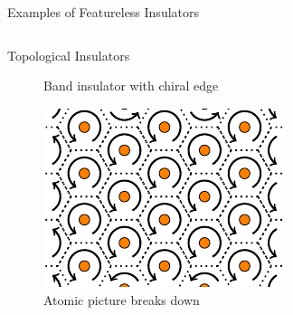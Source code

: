 \begin{frame}{Examples of Featureless Insulators}
\begin{columns}[T]
\begin{column}[T]{.5\textwidth}
\begin{block}{Topological Insulators}
\begin{figure}
			\caption{Band insulator with chiral edge}
		\end{figure}
		\begin{figure}
			\vskip-0.7cm
				\includegraphics[width=0.5\linewidth]{diagrams/honeycomb_breakdown.pdf}
				\caption{Atomic picture breaks down}
		\end{figure}
	\end{block}

\end{column}
\end{columns}

\end{frame}

